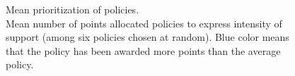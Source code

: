 \documentclass[12pt,english]{article}
\begin{document}
\begin{figure}[h!] %
  \caption[Mean prioritization of policies]{Mean prioritization of policies. \\Mean number of points allocated policies to express intensity of support (among six policies chosen at random). Blue color means that the policy has been awarded more points than the average policy.}\label{fig:points}
\end{figure}

\clearpage
        

\clearpage
\renewcommand{\url}[1]{\href{#1}{Link}} %

\end{document}

